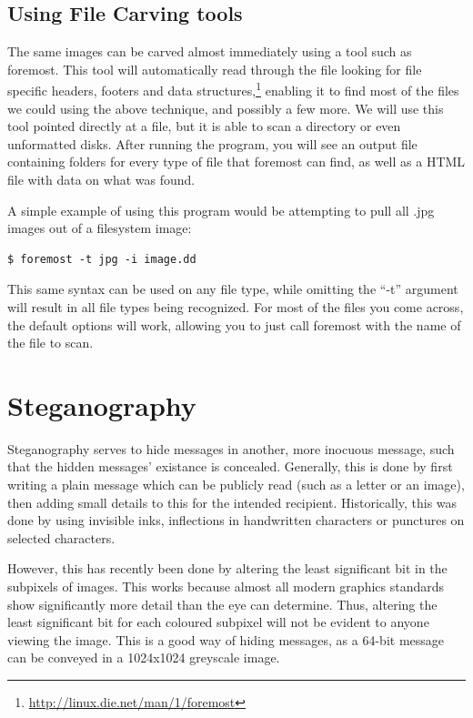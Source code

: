 		\subsection{Using File Carving tools}
			The same images can be carved almost immediately using a tool such as foremost.
			This tool will automatically read through the file looking for file specific headers, footers and data structures,\footnote{\url{http://linux.die.net/man/1/foremost}}
			enabling it to find most of the files we could using the above technique, and possibly a few more.
			We will use this tool pointed directly at a file, but it is able to scan a directory or even unformatted disks.
			After running the program, you will see an output file containing folders for every type of file that foremost can find, as well as a HTML file with data on what was found.

			A simple example of using this program would be attempting to pull all .jpg images out of a filesystem image:
			\begin{lstlisting}[style=CLI]
				$ foremost -t jpg -i image.dd
			\end{lstlisting}
			This same syntax can be used on any file type, while omitting the ``-t'' argument will result in all file types being recognized.
			For most of the files you come across, the default options will work, allowing you to just call foremost with the name of the file to scan.


	\section{Steganography}
		Steganography serves to hide messages in another, more inocuous message, such that the hidden messages' existance is concealed.
		Generally, this is done by first writing a plain message which can be publicly read (such as a letter or an image),
		then adding small details to this for the intended recipient.
		Historically, this was done by using invisible inks, inflections in handwritten characters or punctures on selected characters.

		However, this has recently been done by altering the least significant bit in the subpixels of images.
		This works because almost all modern graphics standards show significantly more detail than the eye can determine.
		Thus, altering the least significant bit for each coloured subpixel will not be evident to anyone viewing the image.
		This is a good way of hiding messages, as a 64-bit message can be conveyed in a 1024x1024 greyscale image.

